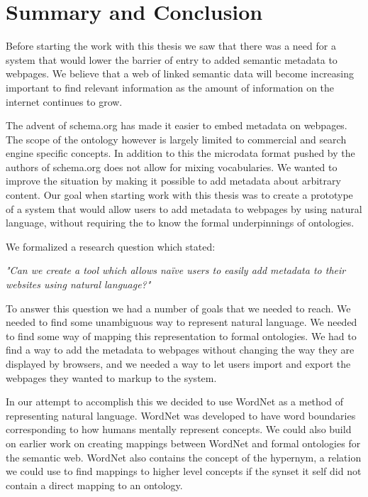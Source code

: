 
\chapter{Summary and Conclusion} %
\label{Conclusion} %
Before starting the work with this thesis we saw that there was a need for a system that would lower the barrier of
entry to added semantic metadata to webpages.
We believe that a web of linked semantic data will become increasing important to find relevant information as the amount
of information on the internet continues to grow.

The advent of schema.org has made it easier to embed metadata on webpages.
The scope of the ontology however is largely limited to commercial and search engine specific concepts.
In addition to this the microdata format pushed by the authors of schema.org does not allow for mixing vocabularies.
We wanted to improve the situation by making it possible to add metadata about arbitrary content.
Our goal when starting work with this thesis was to create a prototype of a system that would allow users to add metadata to webpages by using natural language,
without requiring the to know the formal underpinnings of ontologies.

We formalized a research question which stated:

\emph{"Can we create a tool which allows naïve users to easily add metadata to their websites using natural language?"}

To answer this question we had a number of goals that we needed to reach.
We needed to find some unambiguous way to represent natural language.
We needed to find some way of mapping this representation to formal ontologies.
We had to find a way to add the metadata to webpages without changing the way they are displayed by browsers,
and we needed a way to let users import and export the webpages they wanted to markup to the system.

In our attempt to accomplish this we decided to use WordNet as a method of representing natural language.
WordNet was developed to have word boundaries corresponding to how humans mentally represent concepts.
We could also build on earlier work on creating mappings between WordNet and formal ontologies for the semantic web.
WordNet also contains the concept of the hypernym, a relation we could use to find mappings to higher level concepts
if the synset it self did not contain a direct mapping to an ontology.

